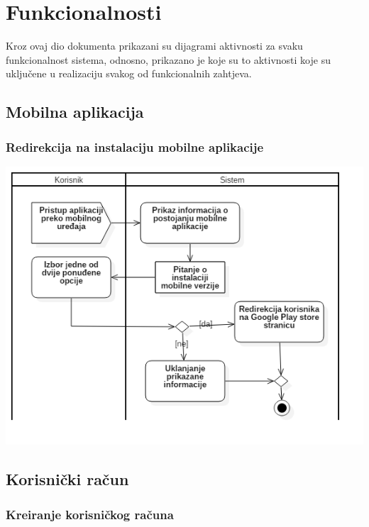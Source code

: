 \chapter{Funkcionalnosti}

Kroz ovaj dio dokumenta prikazani su dijagrami aktivnosti za svaku funkcionalnost sistema, odnosno, prikazano je koje su to aktivnosti koje su uključene u realizaciju svakog od funkcionalnih zahtjeva.

\section{Mobilna aplikacija}

\subsection{Redirekcija na instalaciju mobilne aplikacije}
\begin{center}
    \includegraphics[scale=0.8]{images/MobilnaAplikacija.png}
\end{center}

\section{Korisnički račun}

\subsection{Kreiranje korisničkog računa}

